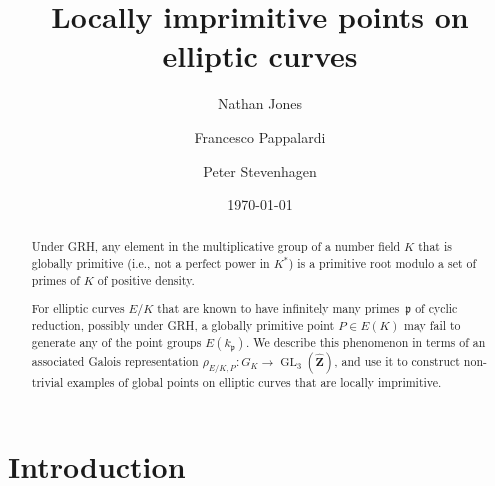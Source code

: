 \documentclass{amsart}
\theoremstyle{plain}
\theoremstyle{definition}
\DeclareMathOperator{\GL}{GL}
\newcommand{\Zee}{{\mathbf{Z}}}
\newcommand{\Zhat}{{\widehat {\Zee}}}
\newcommand{\gothp}{{\mathfrak{p}}}
\begin{document}
\title[Locally imprimitive points on elliptic curves]
{Locally imprimitive points on elliptic curves}

\author[Jones]{Nathan Jones} %
%
\author[Pappalardi]{Francesco Pappalardi}
%
\author[Stevenhagen]{Peter Stevenhagen}
%
\address{Department of Mathematics, Statistics and Computer Science,
         University of Illinois at Chicago, 
         851 S Morgan St, 322 SEO,
         Chicago, IL 60607,
         USA}
        
\address{Dipartimento di Matematica,
         Universit\`a Roma Tre,
         Largo S. L. Murialdo 1,
         I--00146 Rome,
         Italy}
         
\address{Mathematisch Instituut,
         Universiteit Leiden, 
         Postbus 9512, 
         2300 RA Leiden, The Netherlands}
         


\date{\today}


\begin{abstract}
Under GRH, any element in the multiplicative group of a number field $K$ 
that is globally primitive (i.e., not a perfect power in $K^*$) is 
a primitive root modulo a set of primes of $K$ of positive density.

For elliptic curves $E/K$ that are known to have
infinitely many primes~$\gothp$ of cyclic reduction, possibly under GRH,
a globally primitive point $P\in E(K)$ may fail to generate
any of the point groups $E(k_\gothp)$.
We describe this phenomenon in terms of an associated 
Galois representation $\rho_{E/K, P}:G_K\to\GL_3(\Zhat)$,
and use it to construct non-trivial examples
of global points on elliptic curves that are locally imprimitive.
\end{abstract}

\maketitle

\section{Introduction}
\label{S:intro}
\end{document}
